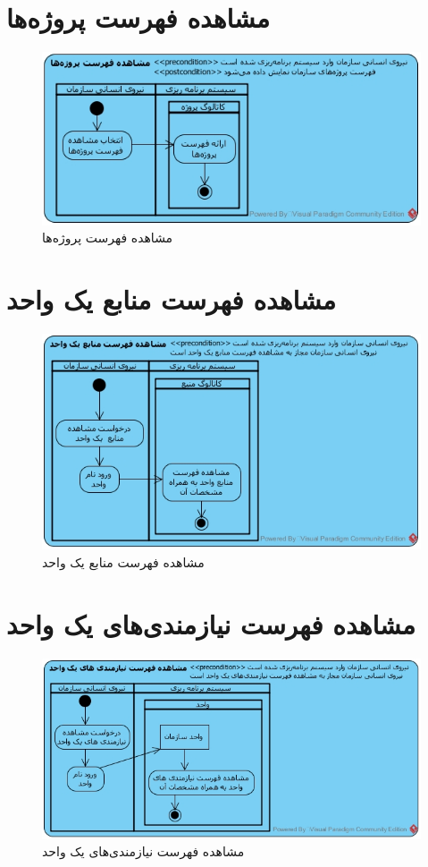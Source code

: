 \section{مشاهده فهرست پروژه‌ها}
\begin{figure}[H]
	\centering
	\includegraphics[scale=0.8]{img/activity/ViewListOfProjects}
	\caption{مشاهده فهرست پروژه‌ها}
\end{figure}


\section{مشاهده فهرست منابع یک واحد}
\begin{figure}[H]
	\centering
	\includegraphics[scale=0.8]{img/activity/ViewListOfResources}
	\caption{مشاهده فهرست منابع یک واحد}
\end{figure}

\section{مشاهده فهرست نیازمندی‌های یک واحد}
\begin{figure}[H]
	\centering
	\includegraphics[scale=0.7]{img/activity/ViewListOfRequirements}
	\caption{مشاهده فهرست نیازمندی‌های یک واحد}
\end{figure}


